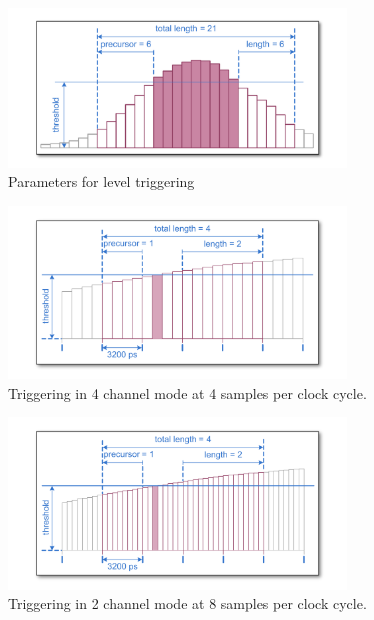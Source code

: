 \begin{figure}[hb]
    \centering
    \includegraphics[width=0.8\textwidth]{figures/level-trigger.pdf}
    \caption{Parameters for level triggering\label{fig:level-trigger}}
\end{figure}

\begin{figure}[ht]
    \centering
    \includegraphics[width=0.8\textwidth]{figures/4ChannelTriggering.pdf}
    \caption{Triggering in 4 channel mode at 4 samples per clock cycle.\label{fig:4ChannelTriggering}}
\end{figure}

\begin{figure}[hb]
    \centering
    \includegraphics[width=0.8\textwidth]{figures/2ChannelTriggering.pdf}
    \caption{Triggering in 2 channel mode at 8 samples per clock cycle.\label{fig:2ChannelTriggering}}
\end{figure}


